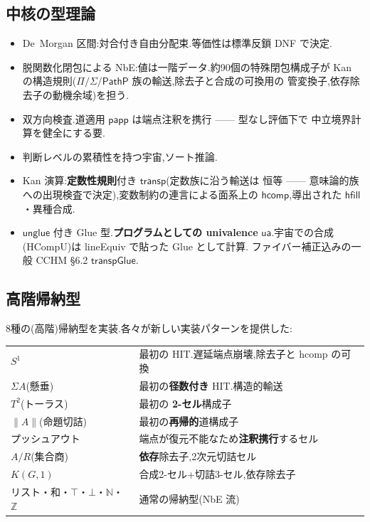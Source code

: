 \documentclass[11pt]{ltjsarticle}
\newcommand{\Z}{\mathbb{Z}}
\newcommand{\N}{\mathbb{N}}
\newcommand{\op}[1]{\ensuremath{\mathsf{#1}}}
\begin{document}
\subsection{中核の型理論}
\begin{itemize}[leftmargin=1.5em]
\item De~Morgan 区間:対合付き自由分配束.等価性は標準反鎖 DNF で決定.
\item 脱関数化閉包による NbE:値は一階データ.約90個の特殊閉包構成子が
Kan の構造規則($\Pi/\Sigma/\op{PathP}$ 族の輸送,除去子と合成の可換用の
管変換子,依存除去子の動機余域)を担う.
\item 双方向検査.道適用 $\op{papp}$ は端点注釈を携行 —— 型なし評価下で
中立境界計算を健全にする要.
\item 判断レベルの累積性を持つ宇宙,ソート推論.
\item Kan 演算:\textbf{定数性規則}付き $\op{transp}$(定数族に沿う輸送は
恒等 —— 意味論的族への出現検査で決定),変数制約の連言による面系上の
$\op{hcomp}$,導出された $\op{hfill}$・異種合成.
\item $\op{unglue}$ 付き Glue 型.\textbf{プログラムとしての univalence}
$\op{ua}$.宇宙での合成(HCompU)は lineEquiv で貼った Glue として計算.
ファイバー補正込みの一般 CCHM \S6.2 $\op{transpGlue}$.
\end{itemize}

\subsection{高階帰納型}
8種の(高階)帰納型を実装.各々が新しい実装パターンを提供した:
\begin{center}
\begin{tabular}{ll}
$S^1$ & 最初の HIT.遅延端点崩壊,除去子と hcomp の可換\\
$\Sigma A$(懸垂) & 最初の\textbf{径数付き} HIT.構造的輸送\\
$T^2$(トーラス) & 最初の \textbf{2-セル}構成子\\
$\lVert A\rVert$(命題切詰) & 最初の\textbf{再帰的}道構成子\\
プッシュアウト & 端点が復元不能なため\textbf{注釈携行}するセル\\
$A/R$(集合商) & \textbf{依存}除去子,2次元切詰セル\\
$K(G,1)$ & 合成2-セル+切詰3-セル,依存除去子\\
リスト・和・$\top$・$\bot$・$\N$・$\Z$ & 通常の帰納型(NbE 流)
\end{tabular}
\end{center}
\end{document}
